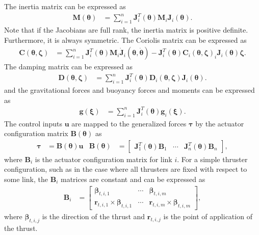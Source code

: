 The inertia matrix
can be expressed as
\begin{align}
    \bm{M}(\bm{\theta}) &= \sum_{i=1}^{n} \bm{J}_{i}^T(\bm{\theta}) \bm{M}_i \bm{J}_{i}(\bm{\theta}).
\end{align}
Note that if the Jacobians are full rank, the inertia matrix is positive definite.
Furthermore, it is always symmetric. The Coriolis matrix can be expressed as
\begin{align}
    \bm{C}(\bm{\theta}, \bm{\zeta}) &=
    \sum_{i=1}^{n} \bm{J}_{i}^T(\bm{\theta}) \bm{M}_i \dot{\bm{J}}_{i}(\bm{\theta},\dot{\bm{\theta}})
    -\bm{J}_{i}^T(\bm{\theta}) \bm{C}_i(\bm{\theta},\bm{\zeta})_i \bm{J}_{i}(\bm{\theta}) \bm{\zeta}.
\end{align}
The damping matrix can be expressed as
\begin{align}
    \bm{D}(\bm{\theta}, \bm{\zeta}) &=
    \sum_{i=1}^{n} \bm{J}_{i}^T(\bm{\theta}) \bm{D}_i(\bm{\theta},\bm{\zeta}) \bm{J}_{i}(\bm{\theta}).
\end{align}
and the gravitational forces and buoyancy forces and moments can be expressed as
\begin{align}
    \bm{g}(\bm{\xi}) &=
    \sum_{i=1}^{n} \bm{J}_{i}^T(\bm{\theta}) \bm{g}_i(\bm{\xi}).
\end{align}
The control inputs $\bm{u}$ are mapped to the generalized forces $\bm{\tau}$ by
the actuator configuration matrix $\bm{B}(\bm{\theta})$ as
\begin{align}
    \bm{\tau} &= \bm{B}(\bm{\theta}) \bm{u} &
    \bm{B}(\bm{\theta}) &= \begin{bmatrix}
        \bm{J}_1^T(\bm{\theta}) \bm{B}_1 & \cdots & \bm{J}_n^T(\bm{\theta}) \bm{B}_n
    \end{bmatrix},
\end{align}
where $\bm{B}_i$ is the actuator configuration matrix for link $i$. For a simple
thruster configuration, such as in the case where all thrusters are fixed with
respect to some link, the $\bm{B}_i$ matrices are constant and can be expressed
as
\begin{align}
    \bm{B}_i &= \begin{bmatrix}
        \bm{\beta}_{t,i,1} & \cdots & \bm{\beta}_{t,i,m} \\
        \bm{r}_{t,i,1} \times \bm{\beta}_{t,i,1} & \cdots & \bm{r}_{t,i,m} \times \bm{\beta}_{t,i,m}
    \end{bmatrix},
\end{align}
where $\bm{\beta}_{t,i,j}$ is the direction of the thrust and $\bm{r}_{t,i,j}$
is the point of application of the thrust.





